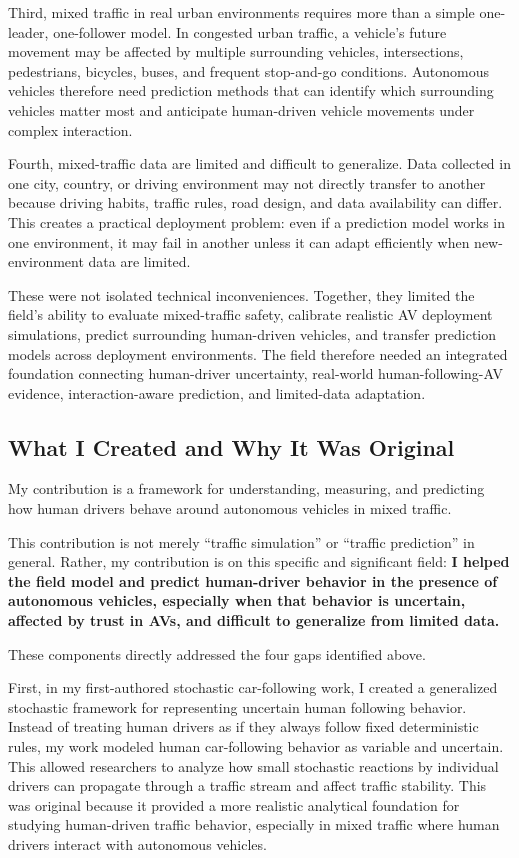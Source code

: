\documentclass[11pt,letterpaper]{article}
\begin{document}
Third, mixed traffic in real urban environments requires more than a simple one-leader, one-follower model. In congested urban traffic, a vehicle's future movement may be affected by multiple surrounding vehicles, intersections, pedestrians, bicycles, buses, and frequent stop-and-go conditions. Autonomous vehicles therefore need prediction methods that can identify which surrounding vehicles matter most and anticipate human-driven vehicle movements under complex interaction.

Fourth, mixed-traffic data are limited and difficult to generalize. Data collected in one city, country, or driving environment may not directly transfer to another because driving habits, traffic rules, road design, and data availability can differ. This creates a practical deployment problem: even if a prediction model works in one environment, it may fail in another unless it can adapt efficiently when new-environment data are limited.

These were not isolated technical inconveniences. Together, they limited the field's ability to evaluate mixed-traffic safety, calibrate realistic AV deployment simulations, predict surrounding human-driven vehicles, and transfer prediction models across deployment environments. The field therefore needed an integrated foundation connecting human-driver uncertainty, real-world human-following-AV evidence, interaction-aware prediction, and limited-data adaptation.

\subsection{What I Created and Why It Was Original}

My contribution is a framework for understanding, measuring, and predicting how human drivers behave around autonomous vehicles in mixed traffic.

This contribution is not merely ``traffic simulation'' or ``traffic prediction'' in general. Rather, my contribution is on this specific and significant field: \textbf{I helped the field model and predict human-driver behavior in the presence of autonomous vehicles, especially when that behavior is uncertain, affected by trust in AVs, and difficult to generalize from limited data.}

These components directly addressed the four gaps identified above.

First, in my first-authored stochastic car-following work, I created a generalized stochastic framework for representing uncertain human following behavior. Instead of treating human drivers as if they always follow fixed deterministic rules, my work modeled human car-following behavior as variable and uncertain. This allowed researchers to analyze how small stochastic reactions by individual drivers can propagate through a traffic stream and affect traffic stability. This was original because it provided a more realistic analytical foundation for studying human-driven traffic behavior, especially in mixed traffic where human drivers interact with autonomous vehicles.
\end{document}

